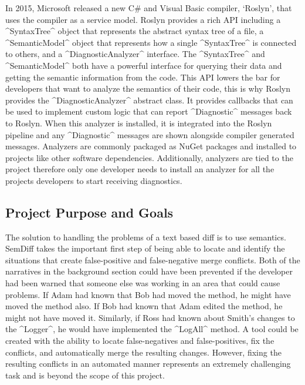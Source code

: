 \documentclass[draftclsnofoot,onecolumn]{IEEEtran}
\begin{document}
In 2015, Microsoft released a new C\# and Visual Basic compiler, `Roslyn', that uses the compiler as a service model. Roslyn provides a rich API including a ^SyntaxTree^ object that represents the abstract syntax tree of a file, a ^SemanticModel^ object that represents how a single ^SyntaxTree^ is connected to others, and a ^DiagnosticAnalyzer^ interface. The ^SyntaxTree^ and ^SemanticModel^ both have a powerful interface for querying their data and getting the semantic information from the code. This API lowers the bar for developers that want to analyze the semantics of their code, this is why Roslyn provides the ^DiagnosticAnalyzer^ abstract class. It provides callbacks that can be used to implement custom logic that can report ^Diagnostic^ messages back to Roslyn. When this analyzer is installed, it is integrated into the Roslyn pipeline and any ^Diagnostic^ messages are shown alongside compiler generated messages. Analyzers are commonly packaged as NuGet packages and installed to projects like other software dependencies. Additionally, analyzers are tied to the project therefore only one developer needs to install an analyzer for all the projects developers to start receiving diagnostics.

\subsection{Project Purpose and Goals}%

The solution to handling the problems of a text based diff is to use semantics. SemDiff takes the important first step of being able to locate and identify the situations that create false-positive and false-negative merge conflicts. Both of the narratives in the background section could have been prevented if the developer had been warned that someone else was working in an area that could cause problems. If Adam had known that Bob had moved the method, he might have moved the method also. If Bob had known that Adam edited the method, he might not have moved it. Similarly, if Ross had known about Smith's changes to the ^Logger^, he would have implemented the ^LogAll^ method. A tool could be created with the ability to locate false-negatives and false-positives, fix the conflicts, and automatically merge the resulting changes. However, fixing the resulting conflicts in an automated manner represents an extremely challenging task and is beyond the scope of this project.
\end{document}
